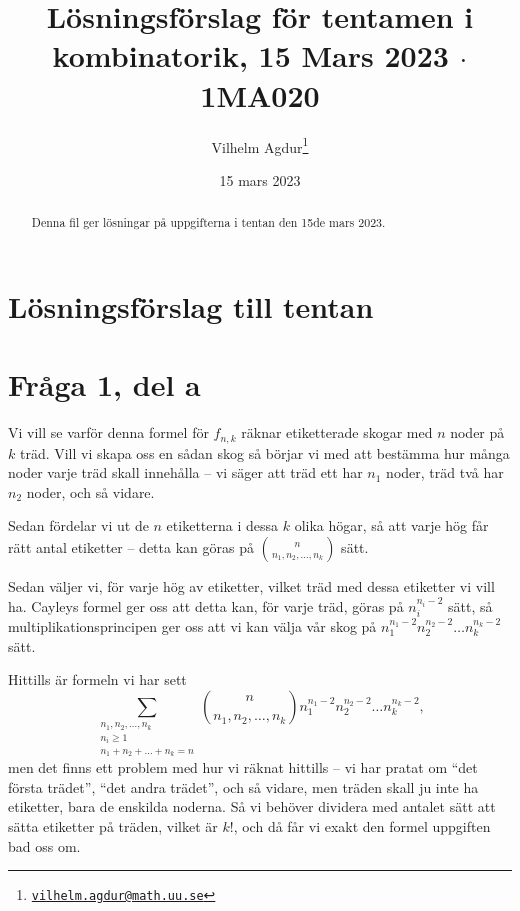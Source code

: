 \documentclass[nobib]{tufte-handout}
\title{Lösningsförslag för tentamen i kombinatorik, 15 Mars 2023 $\cdot$ 1MA020}
\author[Vilhelm Agdur]{Vilhelm Agdur\thanks{\href{mailto:vilhelm.agdur@math.uu.se}{\nolinkurl{vilhelm.agdur@math.uu.se}}}}
\date{15 mars 2023}
\begin{document}

\maketitle%

\begin{abstract}
\noindent

Denna fil ger lösningar på uppgifterna i tentan den 15de mars 2023.

\end{abstract}

\section{Lösningsförslag till tentan}

\section{Fråga 1, del a}

Vi vill se varför denna formel för $f_{n,k}$ räknar etiketterade skogar med $n$ noder på $k$ träd. Vill vi skapa oss en sådan skog så börjar vi med att bestämma hur många noder varje träd skall innehålla -- vi säger att träd ett har $n_1$ noder, träd två har $n_2$ noder, och så vidare.

Sedan fördelar vi ut de $n$ etiketterna i dessa $k$ olika högar, så att varje hög får rätt antal etiketter -- detta kan göras på $\binom{n}{n_1, n_2, \ldots, n_k}$ sätt.

Sedan väljer vi, för varje hög av etiketter, vilket träd med dessa etiketter vi vill ha. Cayleys formel ger oss att detta kan, för varje träd, göras på $n_i^{n_i-2}$ sätt, så multiplikationsprincipen ger oss att vi kan välja vår skog på $n_1^{n_1-2}n_2^{n_2-2}\ldots n_k^{n_k-2}$ sätt.

Hittills är formeln vi har sett
$$\sum_{\substack{n_1, n_2, \ldots, n_k\\ n_i \geq 1\\n_1 + n_2 + \ldots + n_k = n}} \binom{n}{n_1, n_2, \ldots, n_k}n_1^{n_1-2}n_2^{n_2-2}\ldots n_k^{n_k-2},$$
men det finns ett problem med hur vi räknat hittills -- vi har pratat om ``det första trädet'', ``det andra trädet'', och så vidare, men träden skall ju inte ha etiketter, bara de enskilda noderna. Så vi behöver dividera med antalet sätt att sätta etiketter på träden, vilket är $k!$, och då får vi exakt den formel uppgiften bad oss om.
\end{document}
